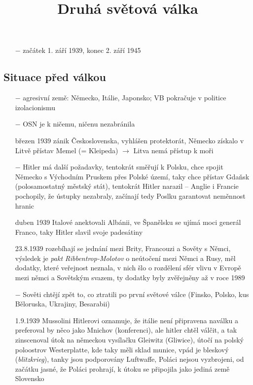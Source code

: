 \documentclass{article}
\title{\vspace{-2cm}Druhá světová válka\vspace{-1.7cm}}
\date{}
\author{}
\begin{document}
\maketitle

\begin{itemize}
    \vspace{-0.5em}
    \setlength\itemsep{0.15em}
    \item[$-$] začátek 1. září 1939, konec 2. září 1945
\end{itemize}
\subsection*{Situace před válkou}
\begin{itemize}
    \vspace{-0.5em}
    \setlength\itemsep{0.15em}
    \item[$-$] agresivní země: Německo, Itálie, Japonsko; VB pokračuje v politice izolacionismu
    \item[$-$] OSN je k ničemu, ničenu nezabránila
    \item[březen 1939] zánik Československa, vyhlášen protektorát, Německo získalo v Litvě přístav Memel (= Kleipeda) $\rightarrow$ Litva nemá přístup k moři
    \item[$-$] Hitler má další požadavky, tentokrát směřují k Polsku, chce spojit Německo s Východním Pruskem přes Polské území, taky chce přístav Gdaňsk (polosamostatný městský stát), tentokrát Hitler narazil -- Anglie i Francie pochopily, že ústupky nezabraly, začínají tedy Poslku garantovat neměnnost hranic
    \item[duben 1939] Italové anektovali Albánii, ve Španělsku se ujímá moci generál Franco, taky Hitler slavil svoje padesátiny
    \item[23.8.1939] rozebíhají se jednání mezi Brity, Francouzi a Sověty s Němci, výsledek je \textit{pakt Ribbentrop-Molotov} o neútočení mezi Němci a Rusy, měl dodatky, které veřejnost neznala, v nich šlo o rozdělení sfér vlivu v Evropě mezi němci a Sovětským svazem, ty dodatky byly zvěřejněny až v roce 1989
    \item[$-$] Sověti chtějí zpět to, co ztratili po první světové válce (Finsko, Polsko, kus Běloruska, Ukrajiny, Besarabii)
    \item[1.9.1939] Mussolini Hitlerovi oznamuje, že itálie není připravena naválku a preferoval by něco jako Mnichov (konferenci), ale hitler chtěl válčit, a tak zinscenoval útok na německou vysílačku Gleiwitz (Gliwice), útočí na polský poloostrov Westerplatte, kde taky měli sklad munice, vpád je bleskový (\textit{blitzkrieg}), tanky jsou podporovány Luftwaffe, Poláci nejsou vyzbrojeni, od začátku jasné, že Poláci prohrají, k útoku se připojila jako jediná země Slovensko

\end{itemize}
\end{document}
